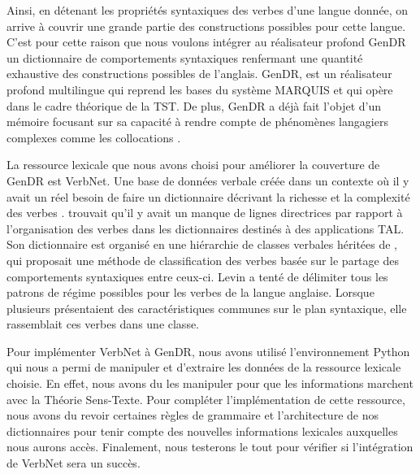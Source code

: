 Ainsi, en détenant les propriétés syntaxiques des verbes d'une langue donnée, on arrive à couvrir une grande partie des constructions possibles pour cette langue. C'est pour cette raison que nous voulons intégrer au réalisateur profond GenDR un dictionnaire de comportements syntaxiques renfermant une quantité exhaustive des constructions possibles de l'anglais. GenDR, est un réalisateur profond multilingue qui reprend les bases du système MARQUIS et qui opère dans le cadre théorique de la \ac{TST}. De plus, GenDR a déjà fait l'objet d'un mémoire focusant sur sa capacité à rendre compte de phénomènes langagiers complexes comme les collocations \cite{LambreyImplementationcollocationspour2017, lareau18}.

La ressource lexicale que nous avons choisi pour améliorer la couverture de GenDR est VerbNet. Une base de données verbale créée dans un contexte où il y avait un réel besoin de faire un dictionnaire décrivant la richesse et la complexité des verbes \citep{KipperClassBasedConstructionVerb2000}. \cite{SchulerVerbnetBroadcoverageComprehensive2005} trouvait qu'il y avait un manque de lignes directrices par rapport à l'organisation des verbes dans les dictionnaires destinés à des applications \ac{TAL}. Son dictionnaire est organisé en une hiérarchie de classes verbales héritées de \cite{verb-classes.levin.1993}, qui proposait une méthode de classification des verbes basée sur le partage des comportements syntaxiques entre ceux-ci. Levin a tenté de délimiter tous les patrons de régime possibles pour les verbes de la langue anglaise. Lorsque plusieurs présentaient des caractéristiques communes sur le plan syntaxique, elle rassemblait ces verbes dans une classe.

Pour implémenter VerbNet à GenDR, nous avons utilisé l'environnement Python qui nous a permi de manipuler et d'extraire les données de la ressource lexicale choisie. En effet, nous avons du les manipuler pour que les informations marchent avec la Théorie Sens-Texte. Pour compléter l'implémentation de cette ressource, nous avons du revoir certaines règles de grammaire et l'architecture de nos dictionnaires pour tenir compte des nouvelles informations lexicales auxquelles nous aurons accès. Finalement, nous testerons le tout pour vérifier si l'intégration de VerbNet sera un succès.

